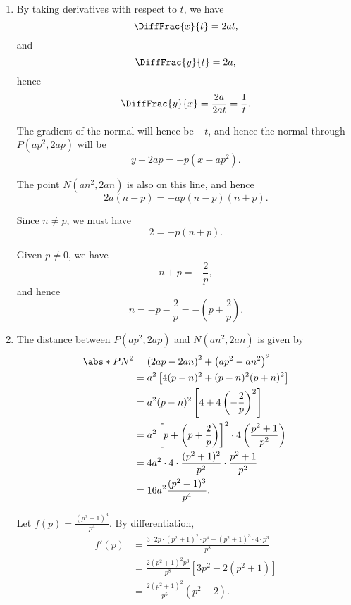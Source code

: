 \Question{\currfilebase}

\begin{enumerate}
    \item By taking derivatives with respect to \(t\), we have
          \[
              \DiffFrac{x}{t} = 2at,
          \]
          and
          \[
              \DiffFrac{y}{t} = 2a,
          \]
          hence
          \[
              \DiffFrac{y}{x} = \frac{2a}{2at} = \frac{1}{t}.
          \]

          The gradient of the normal will hence be \(-t\), and hence the normal through \(P(ap^2, 2ap)\) will be
          \[
              y - 2ap = -p (x - ap^2).
          \]

          The point \(N(an^2, 2an)\) is also on this line, and hence
          \[
              2a (n - p) = -ap (n - p) (n + p).
          \]

          Since \(n \neq p\), we must have
          \[
              2 = -p (n + p).
          \]

          Given \(p \neq 0\), we have
          \[
              n + p = -\frac{2}{p},
          \]
          and hence
          \[
              n = -p - \frac{2}{p} = -\left(p + \frac{2}{p}\right).
          \]

    \item The distance between \(P(ap^2, 2ap)\) and \(N(an^2, 2an)\) is given by
          \begin{align*}
              \abs*{PN}^2 & = \left(2ap - 2an\right)^2 + \left(ap^2 - an^2\right)^2                                        \\
                          & = a^2 \left[4 (p - n)^2 + (p - n)^2 (p + n)^2\right]                                           \\
                          & = a^2 (p - n)^2 \left[4 + 4 \left(-\frac{2}{p}\right)^2\right]                                 \\
                          & = a^2 \left[p + \left(p + \frac{2}{p}\right)\right]^2 \cdot 4 \left(\frac{p^2 + 1}{p^2}\right) \\
                          & = 4a^2 \cdot 4 \cdot \frac{(p^2 + 1)^2}{p^2} \cdot \frac{p^2 + 1}{p^2}                         \\
                          & = 16 a^2 \frac{(p^2 + 1)^3}{p^4}.
          \end{align*}

          Let \(f(p) = \frac{(p^2 + 1)^3}{p^4}\). By differentiation,
          \begin{align*}
              f'(p) & = \frac{3 \cdot 2p \cdot (p^2 + 1)^2 \cdot p^4 - (p^2 + 1)^3 \cdot 4 \cdot p^3}{p^8} \\
                    & = \frac{2 (p^2 + 1)^2 p^3}{p^8} \left[3p^2 - 2(p^2 + 1)\right]                       \\
                    & = \frac{2 (p^2 + 1)^2}{p^5} \left(p^2 - 2\right).
          \end{align*}


\end{enumerate}
